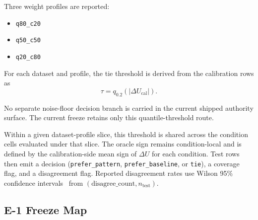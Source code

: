 \documentclass[11pt,a4paper]{article}
\begin{document}
Three weight profiles are reported:
\begin{itemize}
  \item \texttt{q80\_c20}
  \item \texttt{q50\_c50}
  \item \texttt{q20\_c80}
\end{itemize}

For each dataset and profile, the tie threshold is derived from the
calibration rows as
\[
\tau = q_{0.2}\left(|\Delta U_{\mathrm{cal}}|\right).
\]

No separate noise-floor decision branch is carried in the current shipped
authority surface. The current freeze retains only this quantile-threshold
route.

Within a given dataset-profile slice, this threshold is shared across the
condition cells evaluated under that slice. The oracle sign remains
condition-local and is defined by the calibration-side mean sign of $\Delta U$
for each condition. Test rows then emit a decision
(\texttt{prefer\_pattern}, \texttt{prefer\_baseline}, or \texttt{tie}), a
coverage flag, and a disagreement flag. Reported disagreement rates use Wilson
95\% confidence intervals~\cite{wilson1927} from
$(\mathrm{disagree\_count}, n_{\mathrm{test}})$.

\subsection{E-1 Freeze Map}
\end{document}

